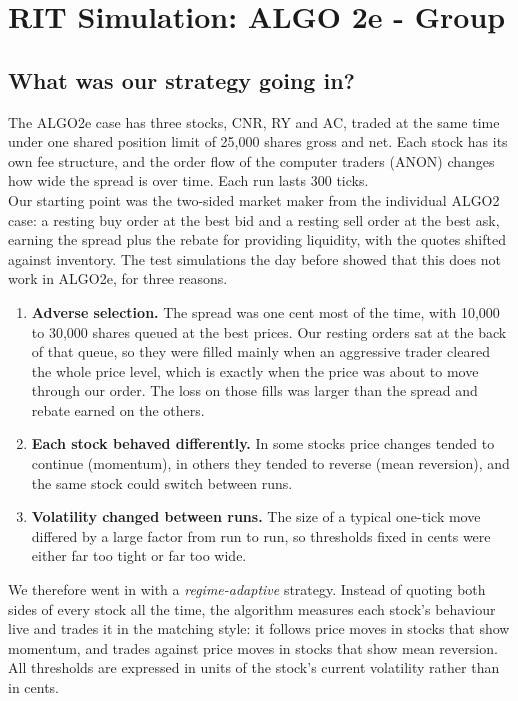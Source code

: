 \documentclass{article}
\begin{document}
\section{RIT Simulation: ALGO 2e - Group}

\subsection{What was our strategy going in?}

The ALGO2e case has three stocks, CNR, RY and AC, traded at the same time under one shared position limit of 25{,}000 shares gross and net. Each stock has its own fee structure, and the order flow of the computer traders (ANON) changes how wide the spread is over time. Each run lasts 300 ticks.\\

\noindent Our starting point was the two-sided market maker from the individual ALGO2 case: a resting buy order at the best bid and a resting sell order at the best ask, earning the spread plus the rebate for providing liquidity, with the quotes shifted against inventory. The test simulations the day before showed that this does not work in ALGO2e, for three reasons.
\begin{enumerate}
  \item \textbf{Adverse selection.} The spread was one cent most of the time, with 10{,}000 to 30{,}000 shares queued at the best prices. Our resting orders sat at the back of that queue, so they were filled mainly when an aggressive trader cleared the whole price level, which is exactly when the price was about to move through our order. The loss on those fills was larger than the spread and rebate earned on the others.
  \item \textbf{Each stock behaved differently.} In some stocks price changes tended to continue (momentum), in others they tended to reverse (mean reversion), and the same stock could switch between runs.
  \item \textbf{Volatility changed between runs.} The size of a typical one-tick move differed by a large factor from run to run, so thresholds fixed in cents were either far too tight or far too wide.
\end{enumerate}

\noindent We therefore went in with a \emph{regime-adaptive} strategy. Instead of quoting both sides of every stock all the time, the algorithm measures each stock's behaviour live and trades it in the matching style: it follows price moves in stocks that show momentum, and trades against price moves in stocks that show mean reversion. All thresholds are expressed in units of the stock's current volatility rather than in cents.
\end{document}
